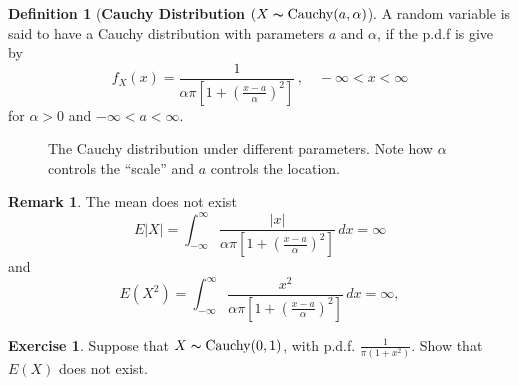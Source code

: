 \documentclass[12pt,a4paper]{report}
\theoremstyle{definition}
\newtheorem{definition}[thm]{Definition}
\newtheorem{exe}[thm]{Exercise}
\newtheorem{remark}[thm]{Remark}
\theoremstyle{plain}
\theoremstyle{definition}
\begin{document}
\begin{definition}[\textbf{Cauchy Distribution $(X\thicksim \operatorname{Cauchy}(a,\alpha)$}]
A random variable is said to have a Cauchy distribution with parameters $a$ and $\alpha$, if the p.d.f is give by\[f_X(x) = \frac{1}{\alpha\pi\left[1 + \left(\frac{x - a}{\alpha}\right)^2\right]}\, , \quad -\infty < x < \infty\] for $\alpha > 0$ and $-\infty  < a < \infty$.
\end{definition}


\begin{figure}[H]
\centering
{}
\caption{The Cauchy distribution under different parameters. Note how $\alpha$ controls the ``scale'' and $a$ controls the location.}
\end{figure}



\begin{remark}
The mean does not exist 
\[E|X|=\int^{\infty}_{-\infty}\frac{|x|}{\alpha\pi\left[1+\left(\frac{x-a}{\alpha}\right)^2\right]}\, dx = \infty\]
and 
\[E(X^2)=\int^{\infty}_{-\infty}\frac{x^2}{\alpha\pi\left[1+\left(\frac{x-a}{\alpha}\right)^2\right]}\, dx = \infty ,\]
\end{remark}






\begin{exe}
Suppose that $X\thicksim\operatorname{Cauchy}(0,1)$, with p.d.f. $\frac{1}{\pi(1 + x^2)}$. Show that $E(X)$ does not exist.
\end{exe}
\end{document}
